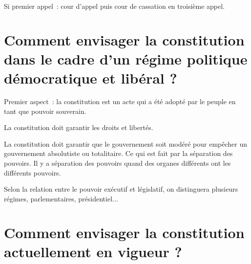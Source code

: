 ﻿\documentclass[12pt, a4paper, openany]{book}
\begin{document}
Si premier appel~: cour d'appel puis cour de cassation en troisième appel.


\section{Comment envisager la constitution dans le cadre d'un régime politique démocratique et libéral ?}

Premier aspect~: la constitution est un acte qui a été adopté par le peuple en tant que pouvoir souverain.

La constitution doit garantir les droits et libertés.

La constitution doit garantir que le gouvernement soit modéré pour empêcher un gouvernement absolutiste ou totalitaire. Ce qui est fait par la séparation des pouvoirs. Il y a séparation des pouvoirs quand des organes différents ont les différents pouvoirs.

Selon la relation entre le pouvoir exécutif et législatif, on distinguera plusieurs régimes, parlementaires, présidentiel...


\section{Comment envisager la constitution actuellement en vigueur ?}
\end{document}
